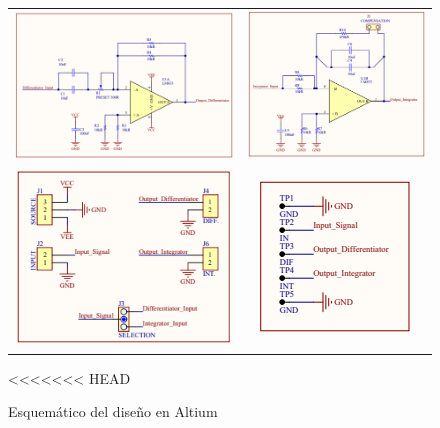 \begin{figure}[H]
	\centering
	\begin{tabular}{c c}
		\includegraphics[scale=0.62]{Recursos/Altium/Derivador_esquematico.png} &
		\includegraphics[scale=0.65]{Recursos/Altium/Integrador_esquematico.png} \\
		\includegraphics[scale=0.7]{Recursos/Altium/Entradas_salidas_esquematico.png} &
		\includegraphics[scale=0.7]{Recursos/Altium/Puntos_prueba_esquematico.png}
	\end{tabular}
<<<<<<< HEAD
	\caption{Esquem\'atico del dise\~no en Altium}
	\label{fig:altium_sch}
\end{figure}

